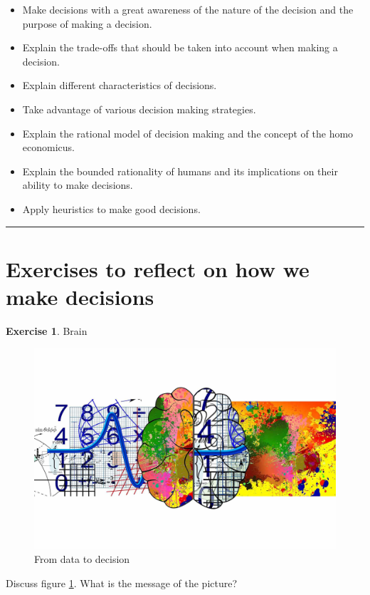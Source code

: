 \documentclass[
  12pt,
  oneside]{book}
\providecommand{\tightlist}{%
  \setlength{\itemsep}{0pt}\setlength{\parskip}{0pt}}
\theoremstyle{definition}
\theoremstyle{definition}
\theoremstyle{definition}
\newtheorem{exercise}{Exercise}[chapter]
\theoremstyle{definition}
\theoremstyle{remark}
\begin{document}
\begin{itemize}
\tightlist
\item
  Make decisions with a great awareness of the nature of the decision and the purpose of making a decision.
\item
  Explain the trade-offs that should be taken into account when making a decision.
\item
  Explain different characteristics of decisions.
\item
  Take advantage of various decision making strategies.
\item
  Explain the rational model of decision making and the concept of the homo economicus.
\item
  Explain the bounded rationality of humans and its implications on their ability to make decisions.
\item
  Apply heuristics to make good decisions.
\end{itemize}

\begin{center}\rule{0.5\linewidth}{0.5pt}\end{center}

\section{Exercises to reflect on how we make decisions}\label{exercises-to-reflect-on-how-we-make-decisions}

\begin{exercise}
\protect\hypertarget{exr:brain-color}{}\label{exr:brain-color}Brain

\begin{figure}
\centering
\includegraphics[width=1\textwidth,height=\textheight]{fig/brain-color.jpg}
\caption[\label{fig:brain-color} From data to decision]{\label{fig:brain-color} From data to decision\footnotemark{}}
\end{figure}

Discuss figure \ref{fig:brain-color}. What is the message of the picture?
\end{exercise}
\end{document}
